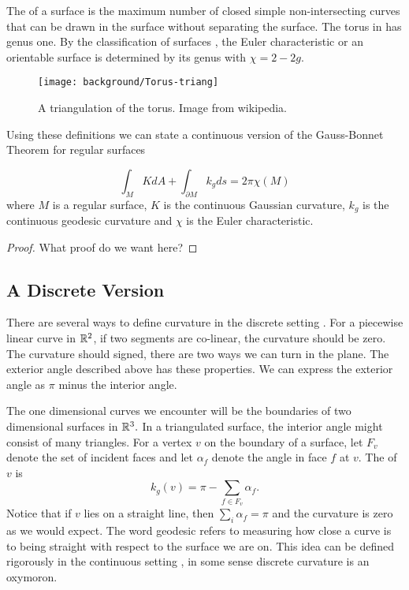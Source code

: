 The  of a surface is the maximum number of closed simple
non-intersecting curves that can be drawn in the surface without separating
the surface.
The torus in  has genus one.
By the classification of surfaces \cite{munkres}, the Euler characteristic or an orientable surface
is determined by its genus with $\chi=2-2g$.



\begin{figure}[htb]
\centering
\texttt{[image: background/Torus-triang]}
\caption{A triangulation of the torus. Image from wikipedia.}
\label{fig:triangulated-torus}
\end{figure}



Using these definitions we can state a continuous version of
the Gauss-Bonnet Theorem for regular surfaces
\begin{theorem} \label{thm:g-b-c}

$$\int_{M} K dA+ \int_{\partial M} k_g ds = 2\pi \chi(M)$$
where $M$ is a regular surface, $K$ is the continuous Gaussian curvature,
 $k_g$ is the continuous geodesic curvature and
$\chi$ is the Euler characteristic.
\end{theorem}

\begin{proof}
	What proof do we want here?
\end{proof}

\subsection{A Discrete Version}
There are several ways to define curvature in the discrete setting \cite{Crane:2013}.
For a piecewise linear curve in $\mathbb{R}^2$, 
if two segments are co-linear, the curvature should be zero.
The curvature should signed, there are two ways we can turn in
the plane.
The exterior angle described above has these properties.
We can express the exterior angle as $\pi$ minus the interior angle.

The one dimensional curves we encounter will be the boundaries
of two dimensional surfaces in $\mathbb{R}^3.$
In a triangulated surface, the interior angle might consist of many triangles.
For a vertex $v$ on the boundary of a surface, 
let $F_v$  denote the set of incident faces and let
$\alpha_f$ denote the angle in face $f$ at $v$.
The 
of $v$  is
$$k_{g}(v)= \pi-\sum_{f\in F_v}\alpha_f.$$
Notice that if $v$ lies on a straight line, then $\sum_{i}\alpha_f=\pi$
and the curvature is zero as we would expect.
The word geodesic refers to measuring how close
a curve is to being straight with respect to the surface we are on.
This idea can be defined rigorously in the continuous setting \cite{doc76},
in some sense discrete curvature is an oxymoron. 



